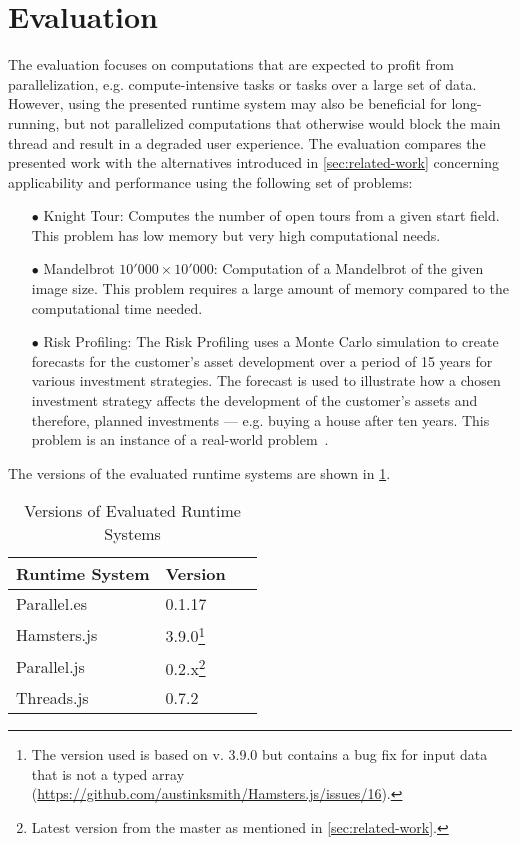 \section{Evaluation}\label{sec:evaluation}
The evaluation focuses on computations that are expected to profit from parallelization, e.g. compute-intensive tasks or tasks over a large set of data. However, using the presented runtime system may also be beneficial for long-running, but not parallelized computations that otherwise would block the main thread and result in a degraded user experience. The evaluation compares the presented work with the alternatives introduced in \cref{sec:related-work} concerning applicability and performance using the following set of problems:

\begin{itemize}
	\item[$\bullet$] Knight Tour: Computes the number of open tours from a given start field. This problem has low memory but very high computational needs.
	\item[$\bullet$] Mandelbrot $10'000 \times 10'000$: Computation of a Mandelbrot of the given image size. This problem requires a large amount of memory compared to the computational time needed.
	\item[$\bullet$] Risk Profiling: The Risk Profiling uses a Monte Carlo simulation to create forecasts for the customer's asset development over a period of 15 years for various investment strategies. The forecast is used to illustrate how a chosen investment strategy affects the development of the customer's assets and therefore, planned investments --- e.g. buying a house after ten years. This problem is an instance of a real-world problem~\cite{Kwsoft2016}.
\end{itemize}

The versions of the evaluated runtime systems are shown in \cref{tab:runtime-system-version}.

\begin{table}
	\centering
	\begin{tabular}{p{0.6\linewidth} l}
		\toprule
		Runtime System & Version \\ \midrule
		Parallel.es & 0.1.17 \\
		Hamsters.js & 3.9.0\footnote{The version used is based on v. 3.9.0 but contains a bug fix for input data that is not a typed array (\url{https://github.com/austinksmith/Hamsters.js/issues/16}).} \\
		Parallel.js & 0.2.x\footnote{Latest version from the master as mentioned in \cref{sec:related-work}.} \\
		Threads.js & 0.7.2 \\ \bottomrule
	\end{tabular}
	\caption{Versions of Evaluated Runtime Systems}
	\label{tab:runtime-system-version}
\end{table}


